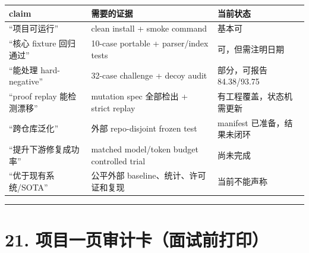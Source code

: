 \documentclass[UTF8,12pt,openany]{ctexbook}
\begin{document}
\begin{center}
\small
\begin{longtable}{|p{}|p{}|p{}|}
\toprule
claim & 需要的证据 & 当前状态 \\
\midrule
“项目可运行” & clean install + smoke command & 基本可 \\
“核心 fixture 回归通过” & 10-case portable + parser/index tests & 可，但需注明日期 \\
“能处理 hard-negative” & 32-case challenge + decoy audit & 部分，可报告 84.38/93.75 \\
“proof replay 能检测漂移” & mutation spec 全部检出 + strict replay & 有工程覆盖，状态机需更新 \\
“跨仓库泛化” & 外部 repo-disjoint frozen test & manifest 已准备，结果未闭环 \\
“提升下游修复成功率” & matched model/token budget controlled trial & 尚未完成 \\
“优于现有系统/SOTA” & 公平外部 baseline、统计、许可证和复现 & 当前不能声称 \\
\bottomrule
\end{longtable}
\end{center}

\hrule

\section{21. 项目一页审计卡（面试前打印）}
\end{document}
